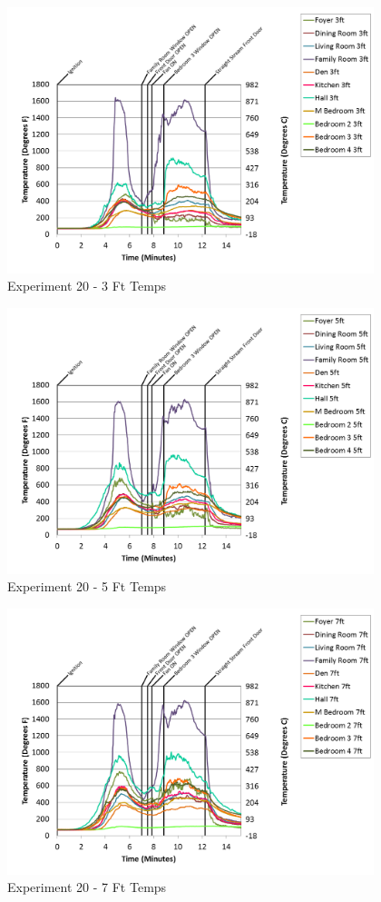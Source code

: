 \documentclass{article}
\begin{document}
\begin{appendices}
\begin{figure}[h!]
	\centering
	\includegraphics[height=3.05in]{0_Images/Results_Charts/Exp_20_Charts/3FtTemps.png}
	\caption{Experiment 20 - 3 Ft Temps}
\end{figure}

\clearpage

\begin{figure}[h!]
	\centering
	\includegraphics[height=3.05in]{0_Images/Results_Charts/Exp_20_Charts/5FtTemps.png}
	\caption{Experiment 20 - 5 Ft Temps}
\end{figure}


\begin{figure}[h!]
	\centering
	\includegraphics[height=3.05in]{0_Images/Results_Charts/Exp_20_Charts/7FtTemps.png}
	\caption{Experiment 20 - 7 Ft Temps}
\end{figure}


\end{appendices}
\end{document}

